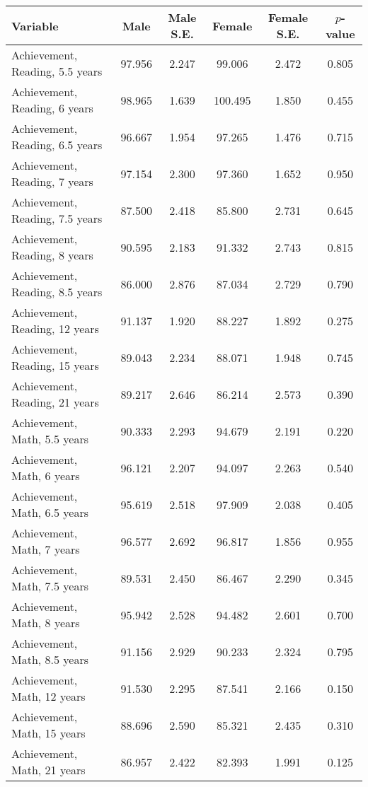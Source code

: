 \begin{tabular}{l c c c c c}
\toprule
\textbf{Variable} & \textbf{Male} & \textbf{Male S.E.}  & \textbf{Female} & \textbf{Female S.E.} & \textbf{$ p $-value} \\
\midrule
Achievement, Reading, 5.5 years & 97.956 & 2.247 &  99.006 & 2.472 & 0.805 \\
Achievement, Reading, 6 years & 98.965 & 1.639 &  100.495 & 1.850 & 0.455 \\
Achievement, Reading, 6.5 years & 96.667 & 1.954 &  97.265 & 1.476 & 0.715 \\
Achievement, Reading, 7 years & 97.154 & 2.300 &  97.360 & 1.652 & 0.950 \\
Achievement, Reading, 7.5 years & 87.500 & 2.418 &  85.800 & 2.731 & 0.645 \\
Achievement, Reading, 8 years & 90.595 & 2.183 &  91.332 & 2.743 & 0.815 \\
Achievement, Reading, 8.5 years & 86.000 & 2.876 &  87.034 & 2.729 & 0.790 \\
Achievement, Reading, 12 years & 91.137 & 1.920 &  88.227 & 1.892 & 0.275 \\
Achievement, Reading, 15 years & 89.043 & 2.234 &  88.071 & 1.948 & 0.745 \\
Achievement, Reading, 21 years & 89.217 & 2.646 &  86.214 & 2.573 & 0.390 \\
Achievement, Math, 5.5 years & 90.333 & 2.293 &  94.679 & 2.191 & 0.220 \\
Achievement, Math, 6 years & 96.121 & 2.207 &  94.097 & 2.263 & 0.540 \\
Achievement, Math, 6.5 years & 95.619 & 2.518 &  97.909 & 2.038 & 0.405 \\
Achievement, Math, 7 years & 96.577 & 2.692 &  96.817 & 1.856 & 0.955 \\
Achievement, Math, 7.5 years & 89.531 & 2.450 &  86.467 & 2.290 & 0.345 \\
Achievement, Math, 8 years & 95.942 & 2.528 &  94.482 & 2.601 & 0.700 \\
Achievement, Math, 8.5 years & 91.156 & 2.929 &  90.233 & 2.324 & 0.795 \\
Achievement, Math, 12 years & 91.530 & 2.295 &  87.541 & 2.166 & 0.150 \\
Achievement, Math, 15 years & 88.696 & 2.590 &  85.321 & 2.435 & 0.310 \\
Achievement, Math, 21 years & 86.957 & 2.422 &  82.393 & 1.991 & 0.125 \\
\bottomrule
\end{tabular}
